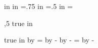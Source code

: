 \raggedbottom        %
     in
     in
    \voffset=.75 in
    \hoffset=.5 in
\parskip=\baselineskip
{}   %



\newif \ifdoubleside
\doublesidefalse  %

\newdimen\paperwidth      %
\newdimen\oddleftmargin   %
\newdimen\oddrightmargin  %
\newdimen\evensideshift   %

\newif\iflettersize
\lettersizetrue        %
\iflettersize{},5 true in  %
\else\paperwidth=210 true mm\fi
{} true in              %
\advance\oddleftmargin by \hoffset
\oddrightmargin=\paperwidth           %
\advance\oddrightmargin by -\hsize
\advance\oddrightmargin by -\oddleftmargin
\evensideshift=\oddrightmargin        %
\advance\evensideshift by -\oddleftmargin

\def\newplainoutput{%
  \ifodd\pageno%
    \shipout\vbox{%
    \makeheadline\pagebody\makefootline}%
    \advancepageno
    \ifnum\outputpenalty>-2000 
    \else\dosupereject
    \fi%
  \else
    \shipout\hbox{\hglue\evensideshift\vbox{%
    \makeheadline\pagebody\makefootline}}%
    \advancepageno
    \ifnum\outputpenalty>-2000 
    \else\dosupereject
    \fi%
  \fi
}

\ifdoubleside\output{\newplainoutput}
\else\output{\plainoutput}
\fi




\newif \ifcanspell
\canspelltrue      %
\def\centimetre{\ifcanspell centimetre\else centimeter\fi}
    \let\centimeter=\centimetre
\def\centre{\ifcanspell centre\else center\fi}
    \let\center=\centre
\def\centred{\ifcanspell centred\else centered\fi}
    \let\centered=\centred

